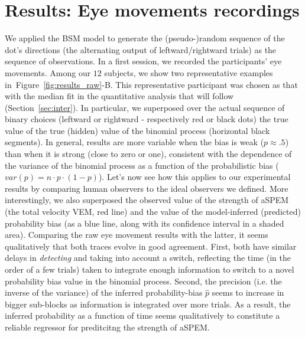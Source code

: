 \documentclass[12pt,english]{article}%
\newcommand{\seeFig}[1]{Figure~\ref{fig:#1}}
\newcommand{\seeSec}[1]{Section~\ref{sec:#1}}
\newcommand{\AM}[1]{\textbf{\textcolor{blue}{[AM: #1]}}}
\begin{document}
\section{Results: Eye movements recordings}
\label{sec:eye_rec}
We applied the BSM model
to generate the (pseudo-)random sequence of
the dot's directions (the alternating output of leftward/rightward trials)
as the sequence of observations.
In a first session, we recorded the participants' eye movements.
Among our $12$ subjects,
we show two representative examples in~\seeFig{results_raw}-B.
This representative participant was chosen as that
with the median fit in the quantitative analysis
that will follow (\seeSec{inter}).
In particular, we superposed over the actual sequence of binary choices
(leftward or rightward - respectively red or black dots)
the true value of the true (hidden) value
of the binomial process (horizontal black segments).
In general, results are more variable when the bias is weak ($p\approx .5$)
than when it is strong (close to zero or one),
consistent with the dependence of the variance of the binomial process
as a function of the probabilistic bias ($var(p)=n\cdot p \cdot (1-p)$).
Let's now see how this applies to our experimental results
by comparing human observers to the ideal observers we defined.
More interestingly, we also superposed
the observed value of the strength of aSPEM
(the total velocity VEM, red line) %
and the value of the model-inferred (predicted) probability bias
(as a blue line, along with its confidence interval in a shaded area).
Comparing the raw eye movement results with the latter,
it seems qualitatively that both traces evolve in good agreement.
First, both have similar delays in \emph{detecting} and taking into account a switch,
reflecting the time (in the order of a few trials) taken to integrate enough information
to switch to a novel probability bias value in the binomial process.
Second, the precision (i.e. the inverse of the variance)
of the inferred probability-bias $\hat{p}$ seems to increase
in bigger sub-blocks as information is integrated over more trials.
As a result, the inferred probability as a function of time
seems qualitatively to constitute a reliable regressor
for preditcitng the strength of aSPEM.

\end{document}
